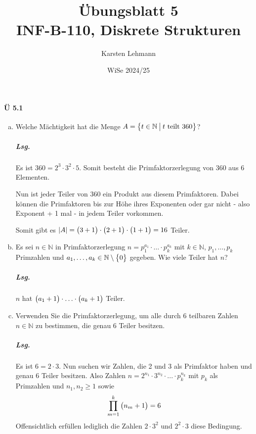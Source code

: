 \documentclass{scrreprt}
\author{Karsten Lehmann}
\date{WiSe 2024/25}
\title{Übungsblatt 5\\INF-B-110, Diskrete Strukturen}
\begin{document}
\paragraph{Ü 5.1}
\begin{enumerate}[(a)]
\item Welche Mächtigkeit hat die Menge
  $A = \qty\big{t \in \mathbb{N} \:{\big |}\: t \text{ teilt } 360}$?

  \subparagraph{Lsg.} Es ist $360 = 2^3 \cdot 3^2 \cdot 5$.
  Somit besteht die Primfaktorzerlegung von 360 aus 6 Elementen.

  Nun ist jeder Teiler von 360 ein Produkt aus diesem Primfaktoren.
  Dabei können die Primfaktoren bis zur Höhe ihres Exponenten oder gar nicht
  - also Exponent + 1 mal - in jedem Teiler vorkommen.

  Somit gibt es
  $\abs{A} = \qty\big(3 + 1) \cdot \qty\big(2 + 1) \cdot \qty\big(1 + 1) = 16$
  Teiler.

\item Es sei $n \in \mathbb{N}$ in Primfaktorzerlegung
  $n = p_1^{a_1} \cdot \ldots \cdot p_k^{a_k}$ mit $k \in \mathbb{N}$,
  $p_1, \ldots, p_k$ Primzahlen und
  $a_1, \ldots, a_k \in \mathbb{N} \setminus \qty\big{0}$ gegeben.
  Wie viele Teiler hat $n$?

  \subparagraph{Lsg.} $n$ hat
  $\qty\big(a_1 + 1) \cdot \ldots \cdot \qty\big(a_k + 1)$
  Teiler.

\item Verwenden Sie die Primfaktorzerlegung, um alle durch 6 teilbaren Zahlen
  $n \in \mathbb{N}$ zu bestimmen, die genau 6 Teiler besitzen.

  \subparagraph{Lsg.} Es ist $6 = 2 \cdot 3$.
  Nun suchen wir Zahlen, die 2 und 3 als Primfaktor haben und genau 6 Teiler besitzen.
  Also Zahlen $n = 2^{n_1} \cdot 3^{n_2} \cdot ... \cdot p_k^{n_k}$ mit $p_k$ als
  Primzahlen und $n_1, n_2 \geq 1$ sowie
  \[
    \prod_{m = 1}^k \qty\big(n_m + 1) = 6
  \]
  Offensichtlich erfüllen lediglich die Zahlen $2 \cdot 3^2$ und $2^2 \cdot 3$
  diese Bedingung.
\end{enumerate}
\end{document}
